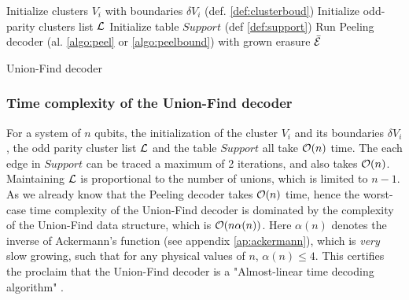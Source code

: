 \begin{algorithm}[h]
  \BlankLine
  \BlankLine
  Initialize clusters $V_i$ with boundaries $\delta V_i$ (def. \ref{def:clusterboud})\;
  Initialize odd-parity clusters list $\mathcal{L}$\;
  Initialize table $Support$ (def \ref{def:support})\;
  \BlankLine
  Run Peeling decoder (al. \ref{algo:peel} or \ref{algo:peelbound}) with grown erasure $\bar{\mathcal{E}}$
  \BlankLine
  \caption{Union-Find decoder \cite{delfosse2017almost}}\label{algo:uf}
\end{algorithm}

\subsubsection{Time complexity of the Union-Find decoder}

For a system of $n$ qubits, the initialization of the cluster $V_i$ and its boundaries $\delta V_i$, the odd parity cluster list $\mathcal{L}$ and the table $Support$ all take $\mathcal{O}(n)$ time. The each edge in $Support$ can be traced a maximum of 2 iterations, and also takes $\mathcal{O}(n)$. Maintaining $\mathcal{L}$ is proportional to the number of unions, which is limited to $n-1$. As we already know that the Peeling decoder takes $\mathcal{O}(n)$ time, hence the worst-case time complexity of the Union-Find decoder is dominated by the complexity of the Union-Find data structure, which is $\mathcal{O}(n\alpha(n))$. Here $\alpha(n)$ denotes the inverse of Ackermann's function (see appendix \ref{ap:ackermann}), which is \emph{very} slow growing, such that for any physical values of $n$, $\alpha(n) \leq 4$. This certifies the proclaim that the Union-Find decoder is a "Almost-linear time decoding algorithm" \cite{delfosse2017almost}. 

